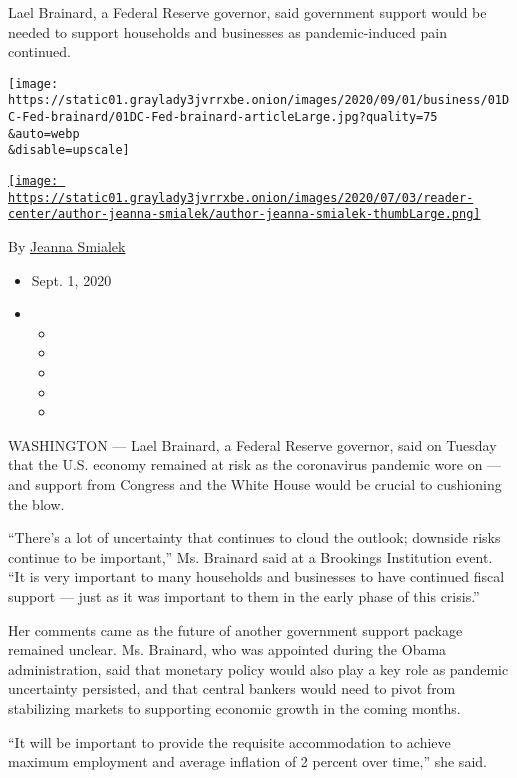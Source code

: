 Lael Brainard, a Federal Reserve governor, said government support would
be needed to support households and businesses as pandemic-induced pain
continued.

\texttt{[image: https://static01.graylady3jvrrxbe.onion/images/2020/09/01/business/01DC-Fed-brainard/01DC-Fed-brainard-articleLarge.jpg?quality=75\\\&auto=webp\\\&disable=upscale]}

\href{https://www.nytimes3xbfgragh.onion/by/jeanna-smialek}{\texttt{[image: https://static01.graylady3jvrrxbe.onion/images/2020/07/03/reader-center/author-jeanna-smialek/author-jeanna-smialek-thumbLarge.png]}}

By \href{https://www.nytimes3xbfgragh.onion/by/jeanna-smialek}{Jeanna
Smialek}

\begin{itemize}
\item
  Sept. 1, 2020
\item
  \begin{itemize}
  \item
  \item
  \item
  \item
  \item
  \end{itemize}
\end{itemize}

WASHINGTON --- Lael Brainard, a Federal Reserve governor, said on
Tuesday that the U.S. economy remained at risk as the coronavirus
pandemic wore on --- and support from Congress and the White House would
be crucial to cushioning the blow.

``There's a lot of uncertainty that continues to cloud the outlook;
downside risks continue to be important,'' Ms. Brainard said at a
Brookings Institution event. ``It is very important to many households
and businesses to have continued fiscal support --- just as it was
important to them in the early phase of this crisis.''

Her comments came as the future of another government support package
remained unclear. Ms. Brainard, who was appointed during the Obama
administration, said that monetary policy would also play a key role as
pandemic uncertainty persisted, and that central bankers would need to
pivot from stabilizing markets to supporting economic growth in the
coming months.

``It will be important to provide the requisite accommodation to achieve
maximum employment and average inflation of 2 percent over time,'' she
said.

